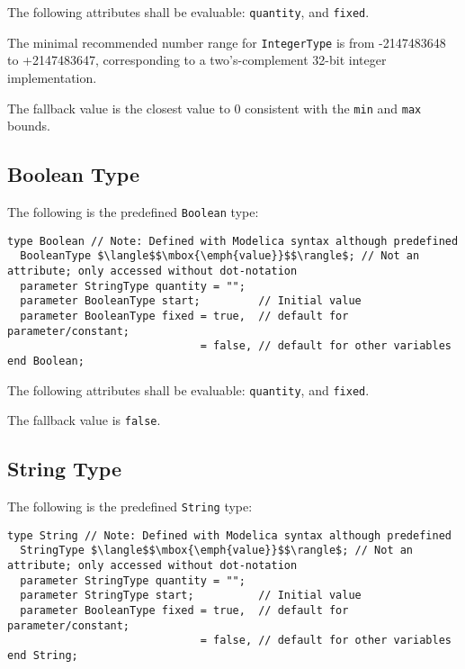 The following attributes shall be evaluable: \lstinline!quantity!, and \lstinline!fixed!.

The minimal recommended number range for \lstinline!IntegerType! is from -2147483648 to +2147483647, corresponding to a two's-complement 32-bit integer implementation.

The fallback value is the closest value to $0$ consistent with the \lstinline!min! and \lstinline!max! bounds.

\subsection{Boolean Type}\label{boolean-type}

The following is the predefined \lstinline!Boolean! type:
\begin{lstlisting}[language=modelica]
type Boolean // Note: Defined with Modelica syntax although predefined
  BooleanType $\langle$$\mbox{\emph{value}}$$\rangle$; // Not an attribute; only accessed without dot-notation
  parameter StringType quantity = "";
  parameter BooleanType start;         // Initial value
  parameter BooleanType fixed = true,  // default for parameter/constant;
                              = false, // default for other variables
end Boolean;
\end{lstlisting}%
%
%
%

The following attributes shall be evaluable: \lstinline!quantity!, and \lstinline!fixed!.

The fallback value is \lstinline!false!.

\subsection{String Type}\label{string-type}

The following is the predefined \lstinline!String! type:
\begin{lstlisting}[language=modelica]
type String // Note: Defined with Modelica syntax although predefined
  StringType $\langle$$\mbox{\emph{value}}$$\rangle$; // Not an attribute; only accessed without dot-notation
  parameter StringType quantity = "";
  parameter StringType start;          // Initial value
  parameter BooleanType fixed = true,  // default for parameter/constant;
                              = false, // default for other variables
end String;
\end{lstlisting}%
%
%

